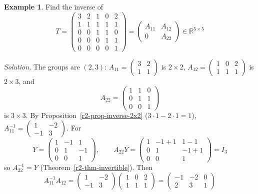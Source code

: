 \documentclass[12pt]{article}
\newcommand{\R}{\mathbb R}
\theoremstyle{definition}
\newtheorem{example}[theorem]{Example}
\begin{document}
\begin{example}\label{r5b-exm-block-inverse}
Find the inverse of
\[
T=\left(\begin{array}{cc|ccc}3&2&1&0&2\\1&1&1&1&1\\\hline0&0&1&1&0\\0&0&0&1&1\\0&0&0&0&1\end{array}\right)
=\begin{pmatrix}A_{11}&A_{12}\\0&A_{22}\end{pmatrix}\in\R^{5\times5}
\]

\textit{Solution.} The groups are \((2,3)\): \(A_{11}=\left(\begin{smallmatrix}3&2\\1&1\end{smallmatrix}\right)\)
is \(2\times2\), \(A_{12}=\left(\begin{smallmatrix}1&0&2\\1&1&1\end{smallmatrix}\right)\) is \(2\times3\), and
\[
A_{22}=\begin{pmatrix}1&1&0\\0&1&1\\0&0&1\end{pmatrix}
\]
is \(3\times3\). By Proposition~\ref{r2-prop-inverse-2x2} (\(3\cdot1-2\cdot1=1\)),
\(A_{11}^{-1}=\left(\begin{smallmatrix}1&-2\\-1&3\end{smallmatrix}\right)\). For
\[
Y=\begin{pmatrix}1&-1&1\\0&1&-1\\0&0&1\end{pmatrix},\qquad
A_{22}Y=\begin{pmatrix}1&-1+1&1-1\\0&1&-1+1\\0&0&1\end{pmatrix}=I_3
\]
so \(A_{22}^{-1}=Y\) (Theorem~\ref{r2-thm-invertible}). Then
\[
A_{11}^{-1}A_{12}=\begin{pmatrix}1&-2\\-1&3\end{pmatrix}\begin{pmatrix}1&0&2\\1&1&1\end{pmatrix}
=\begin{pmatrix}-1&-2&0\\2&3&1\end{pmatrix}
\]
\end{example}
\end{document}
